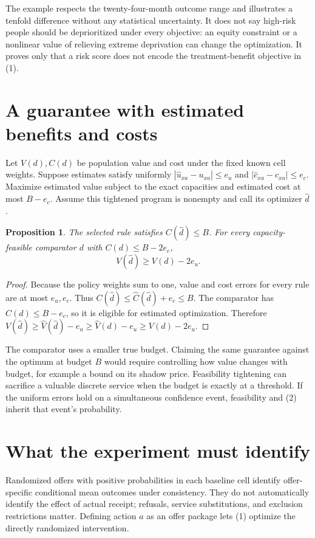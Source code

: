 \documentclass[11pt,a4paper]{article}
\newtheorem{proposition}[theorem]{Proposition}
\begin{document}
The example respects the twenty-four-month outcome range and illustrates a tenfold difference without any statistical uncertainty. It does not say high-risk people should be deprioritized under every objective: an equity constraint or a nonlinear value of relieving extreme deprivation can change the optimization. It proves only that a risk score does not encode the treatment-benefit objective in (1).
\section{A guarantee with estimated benefits and costs}
Let $V(d),C(d)$ be population value and cost under the fixed known cell weights. Suppose estimates satisfy uniformly
$|\widehat u_{xa}-u_{xa}|\le e_u$ and
$|\widehat c_{xa}-c_{xa}|\le e_c$.
Maximize estimated value subject to the exact capacities and estimated cost at most $B-e_c$. Assume this tightened program is nonempty and call its optimizer $\widehat d$.

\begin{proposition}
The selected rule satisfies $C(\widehat d)\le B$. For every capacity-feasible comparator $d$ with $C(d)\le B-2e_c$,
\[
 V(\widehat d)\ge V(d)-2e_u.
 \tag{2}
\]
\end{proposition}
\begin{proof}
Because the policy weights sum to one, value and cost errors for every rule are at most $e_u,e_c$. Thus $C(\widehat d)\le\widehat C(\widehat d)+e_c\le B$. The comparator has $\widehat C(d)\le B-e_c$, so it is eligible for estimated optimization. Therefore
$V(\widehat d)\ge\widehat V(\widehat d)-e_u
\ge\widehat V(d)-e_u\ge V(d)-2e_u$.
\end{proof}
The comparator uses a smaller true budget. Claiming the same guarantee against the optimum at budget $B$ would require controlling how value changes with budget, for example a bound on its shadow price. Feasibility tightening can sacrifice a valuable discrete service when the budget is exactly at a threshold. If the uniform errors hold on a simultaneous confidence event, feasibility and (2) inherit that event's probability.
\section{What the experiment must identify}
Randomized offers with positive probabilities in each baseline cell identify offer-specific conditional mean outcomes under consistency. They do not automatically identify the effect of actual receipt; refusals, service substitutions, and exclusion restrictions matter. Defining action $a$ as an offer package lets (1) optimize the directly randomized intervention.
\end{document}
